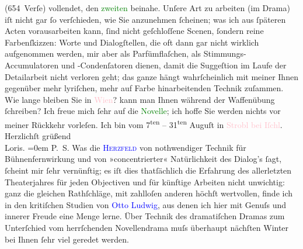                (654 Verſe) vollendet, den \textcolor{green}{zweiten}{} beinahe.\pend
           \pstart
           Unſere Art zu arbeiten (im Drama) iſt nicht gar ſo verſchieden, wie Sie anzunehmen
               ſcheinen; was ich {\pb}aus ſpäteren
               Acten vorausarbeiten kann, ſind nicht geſchloſſene Scenen, ſondern reine
               Farbenſkizzen: Worte und Dialogſtellen, die oft dann gar nicht wirklich aufgenommen
               werden, mir aber als Parfümflaſchen, als Stimmungs-Accumulatoren und -Condenſatoren
               dienen, damit die Suggeſtion im Laufe der Detailarbeit nicht verloren geht; das ganze
               hängt wahrſcheinlich mit meiner Ihnen gegenüber mehr lyriſchen, mehr auf Farbe
               hinarbeitenden Technik zuſammen. Wie lange {\pb}bleiben Sie in \textcolor{pink}{Wien}{}\ledrightnote{\textcolor{pink}{Wien}}? kann man Ihnen während der Waffenübung ſchreiben?\pend
           \pstart
           Ich freue mich ſehr auf die \textcolor{green}{Novelle}{}\ledrightnote{\textcolor{green}{Sterben. Novelle}}; ich hoffe Sie
               werden nichts vor meiner Rückkehr vorleſen.\pend
           \pstart
           Ich bin vom 7\textsuperscript{ten} – 31\textsuperscript{ten} Auguſt in \textcolor{pink}{Strobl bei Iſchl}{}\ledrightnote{\textcolor{pink}{Strobl}}.\pend
           \pstart
           Herzlichſt grüßend{\\[\baselineskip]}\spacefill\mbox{Loris.}\pend
           \leftskip=0em{}\pstart
           \noindent{}\textsc{P. S.} Was die \textcolor{blue}{\textsc{Herzfeld}}{}\ledrightnote{\textcolor{blue}{Marie Herzfeld}} von nothwendiger Technik  für
                  Bühnenfernwirkung und von »concentrierter« Natürlichkeit des Dialog’s ſagt,
                  ſcheint mir ſehr vernünftig; {\pb}es iſt dies thatſächlich die Erfahrung des allerletzten Theaterjahres für jeden
                  Objectiven und für künftige Arbeiten nicht unwichtig: ganz die gleichen
                  Rathſchläge, mit zahlloſen anderen höchſt wertvollen, finde ich in den kritiſchen
                  Studien von \textcolor{blue}{Otto Ludwig}{}\ledrightnote{\textcolor{blue}{Otto Ludwig}}, aus denen ich hier
                  mit Genuſs und innerer Freude eine Menge lerne. Über Technik des dramatiſchen
                  Dramas zum Unterſchied vom herrſchenden Novellendrama muſs überhaupt nächſten
                  Winter bei Ihnen ſehr viel geredet werden.\pend
           \endnumbering{}  
      